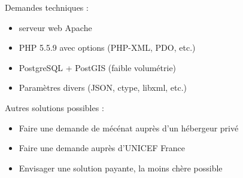 \begin{frame}
	Demandes techniques :
	\begin{itemize}
		\item serveur web Apache
		\item PHP 5.5.9 avec options (PHP-XML, PDO, etc.) 
		\item PostgreSQL + PostGIS (faible volumétrie)
		\item Paramètres divers (JSON, ctype, libxml, etc.)
	\end{itemize}

    Autres solutions possibles :
      \begin{itemize}
        \item Faire une demande de mécénat auprès d'un hébergeur privé
        \item Faire une demande auprès d'UNICEF France
        \item Envisager une solution payante, la moins chère possible
      \end{itemize}
\end{frame}

